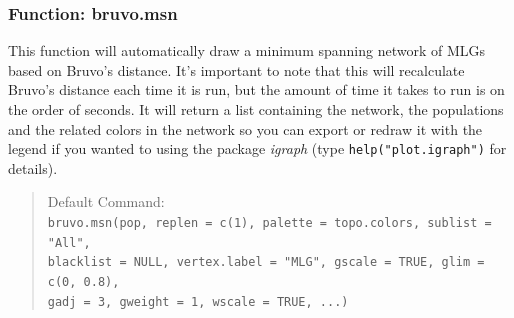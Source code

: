 \documentclass[letterpaper]{article}
\newcommand{\tab}{\hspace*{1em}}
\begin{document}
\subsubsection{Function: bruvo.msn}\label{index:trees:bruvo.msn}
\tab\tab This function will automatically draw a minimum spanning network of MLGs based on Bruvo's distance. It's important to note that this will recalculate Bruvo's distance each time it is run, but the amount of time it takes to run is on the order of seconds. It will return a list containing the network, the populations and the related colors in the network so you can export or redraw it with the legend if you wanted to using the package \textit{igraph} (type \texttt{help("plot.igraph")} for details).
\begin{quote}
Default Command:\\
\texttt{bruvo.msn(pop, replen = c(1), palette = topo.colors, sublist = "All",\\ 
  \tab blacklist = NULL, vertex.label = "MLG", gscale = TRUE, glim = c(0, 0.8),\\ 
  \tab gadj = 3, gweight = 1, wscale = TRUE, ...)
}
\end{quote}
\end{document}
